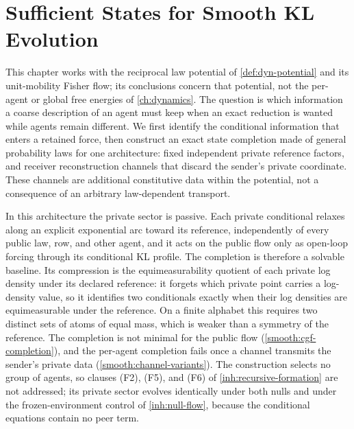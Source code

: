 \chapter{Sufficient States for Smooth KL Evolution}
\label{ch:smooth-closure}

This chapter works with the reciprocal law potential of \cref{def:dyn-potential} and its unit-mobility Fisher flow; its conclusions concern that potential, not the per-agent or global free energies of \cref{ch:dynamics}. The question is which information a coarse description of an agent must keep when an exact reduction is wanted while agents remain different. We first identify the conditional information that enters a retained force, then construct an exact state completion made of general probability laws for one architecture: fixed independent private reference factors, and receiver reconstruction channels that discard the sender's private coordinate. These channels are additional constitutive data within the potential, not a consequence of an arbitrary law-dependent transport.

In this architecture the private sector is passive. Each private conditional relaxes along an explicit exponential arc toward its reference, independently of every public law, row, and other agent, and it acts on the public flow only as open-loop forcing through its conditional KL profile. The completion is therefore a solvable baseline. Its compression is the equimeasurability quotient of each private log density under its declared reference: it forgets which private point carries a log-density value, so it identifies two conditionals exactly when their log densities are equimeasurable under the reference. On a finite alphabet this requires two distinct sets of atoms of equal mass, which is weaker than a symmetry of the reference. The completion is not minimal for the public flow (\cref{smooth:cgf-completion}), and the per-agent completion fails once a channel transmits the sender's private data (\cref{smooth:channel-variants}). The construction selects no group of agents, so clauses (F2), (F5), and (F6) of \cref{inh:recursive-formation} are not addressed; its private sector evolves identically under both nulls and under the frozen-environment control of \cref{inh:null-flow}, because the conditional equations contain no peer term.

